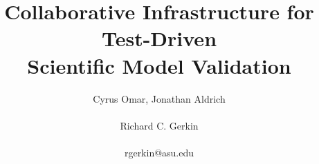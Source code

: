 \documentclass[9pt]{sig-alternate}
\begin{document}
%
\title{Collaborative Infrastructure for Test-Driven\\Scientific Model Validation}


\author{\alignauthor
Cyrus Omar, Jonathan Aldrich\\\\
       \alignauthor Richard C. Gerkin\\
       \\{rgerkin@asu.edu}
}


% 








\maketitle
\end{document}
